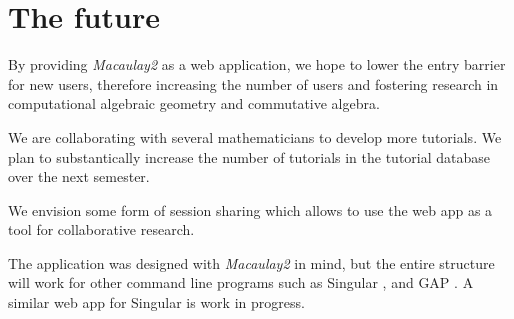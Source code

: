 \documentclass[twocolumn]{article}
\def\M2{{\it Macaulay2}}
\begin{document}
\section{The future}

By providing \M2 as a web application, we hope to lower the
 entry barrier for new users, therefore increasing the number 
 of users and fostering research in computational algebraic geometry and commutative algebra. 


We are collaborating with several mathematicians to develop more tutorials.
We plan to substantically increase the number of tutorials in the tutorial database over the next semester.


We envision some form of session sharing which allows to use the web app as a tool for collaborative research.


The application was designed with \M2 in mind, but
the entire structure will work for other command line programs such as Singular \cite{singular},
and GAP \cite{GAP4}. A similar web app for Singular is work in progress.




\end{document}
